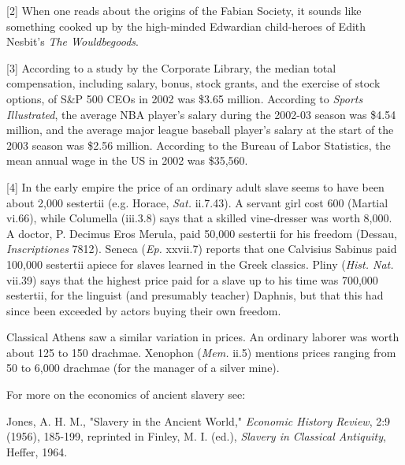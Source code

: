 [2] When one reads about the origins of the Fabian Society, it
                  sounds like something cooked up by the high-minded Edwardian
                  child-heroes of Edith Nesbit's
                  \emph{The Wouldbegoods}.

[3] According to a study by the Corporate Library, the median
                  total compensation, including salary, bonus, stock grants, and
                  the exercise of stock options, of S\&P 500 CEOs in 2002 was
                  \$3.65 million. According to \emph{Sports Illustrated}, the
                  average NBA player's salary during the 2002-03 season was
                  \$4.54 million, and the average major league baseball player's
                  salary at the start of the 2003 season was \$2.56 million.
                  According to the Bureau of Labor Statistics, the mean annual
                  wage in the US in 2002 was \$35,560.

[4] In the early empire the price of an ordinary adult slave
                  seems to have been about 2,000 sestertii (e.g. Horace,
                  \emph{Sat.} ii.7.43). A servant girl cost 600 (Martial vi.66),
                  while Columella (iii.3.8) says that a skilled vine-dresser was
                  worth 8,000. A doctor, P. Decimus Eros Merula, paid 50,000
                  sestertii for his freedom (Dessau, \emph{Inscriptiones} 7812).
                  Seneca (\emph{Ep.} xxvii.7) reports that one Calvisius Sabinus
                  paid 100,000 sestertii apiece for slaves learned in the Greek
                  classics. Pliny (\emph{Hist. Nat.} vii.39) says that the
                  highest price paid for a slave up to his time was 700,000
                  sestertii, for the linguist (and presumably teacher) Daphnis,
                  but that this had since been exceeded by actors buying their
                  own freedom.

Classical Athens saw a similar
                  variation in prices. An ordinary laborer was worth about 125
                  to 150 drachmae. Xenophon (\emph{Mem.} ii.5) mentions prices
                  ranging from 50 to 6,000 drachmae (for the manager of a silver
                  mine).

For more on the economics of ancient slavery
                  see:

Jones, A. H. M., "Slavery in the Ancient
                  World," \emph{Economic History Review}, 2:9 (1956), 185-199,
                  reprinted in Finley, M. I. (ed.),
                  \emph{Slavery in Classical Antiquity}, Heffer, 1964.

